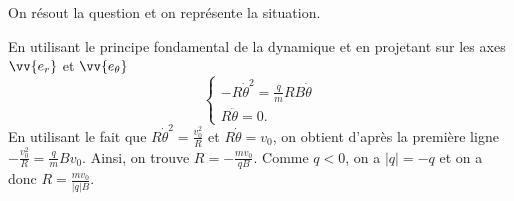 \begin{corrige}
On résout la question et on représente la situation.

                                \initialisationPartieGauche %
En utilisant le principe fondamental de la dynamique et en projetant sur les axes $\vv{e_r}$ et $\vv{e_\theta}$
\[
\begin{cases}
-R\dot{\theta}^2 =\frac{q}{m} RB\dot{\theta} \\
R\ddot{\theta}=0.
\end{cases}
\]
En utilisant le fait que $R\dot{\theta}^2=\frac{v_0^2}{R}$ et $R\dot{\theta}=v_0$, on obtient d'après la première ligne 
$
-\frac{v_0^2}{R}=\frac{q}{m} Bv_0.
$
Ainsi, on trouve $R=-\frac{mv_0}{qB}$. 
Comme $q<0$, on a $|q|=-q$ et on a donc $R=\frac{mv_0}{|q|B}$.
                                \initialisationPartieDroite %
\begin{center}
\def\longueurVecteurs{1.75}
\def\interSpace{0.5}
\def\interSpaceY{2}

\end{center}
                               \finalisationDuPartageDePage %
\end{corrige}


